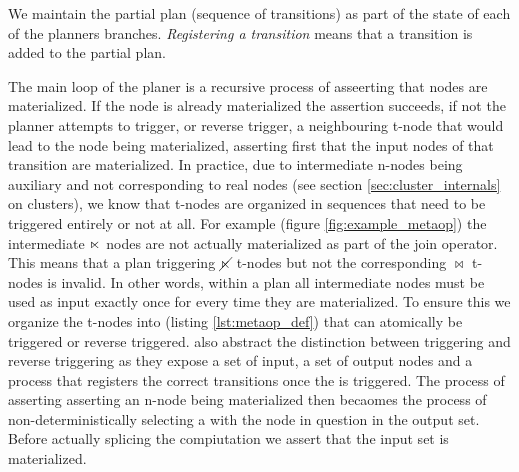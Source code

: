 We maintain the partial plan (sequence of transitions) as part of the
state of each of the planners branches. \emph{Registering a
  transition} means that a transition is added to the partial plan.

The main loop of the planer is a recursive process of asseerting that
nodes are materialized. If the node is already materialized the
assertion succeeds, if not the planner attempts to trigger, or reverse
trigger, a neighbouring t-node that would lead to the node being
materialized, asserting first that the input nodes of that transition
are materialized. In practice, due to intermediate n-nodes being
auxiliary and not corresponding to real nodes (see section
\ref{sec:cluster_internals} on clusters), we know that t-nodes are
organized in sequences that need to be triggered entirely or not at
all. For example (figure \ref{fig:example_metaop}) the intermediate
\(\ltimes\) nodes are not actually materialized as part of the join
operator. This means that a plan triggering \(\cancel\ltimes\) t-nodes but
not the corresponding \(\Join\) t-nodes is invalid. In other words,
within a plan all intermediate nodes must be used as input exactly
once for every time they are materialized. To ensure this we organize
the t-nodes into  (listing \ref{lst:metaop_def}) that
can atomically be triggered or reverse triggered.  also
abstract the distinction between triggering and reverse triggering as
they expose a set of input, a set of output nodes and a process that
registers the correct transitions once the  is
triggered. The process of asserting asserting an n-node being
materialized then becaomes the process of non-deterministically
selecting a  with the node in question in the output
set. Before actually splicing the  compiutation we assert
that the input set is materialized.


